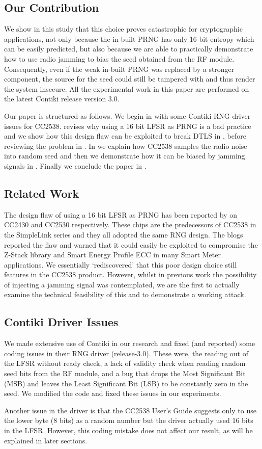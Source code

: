 \subsection{Our Contribution}
We show in this study that this choice proves catastrophic for cryptographic applications, not only because the in-built PRNG has only 16 bit entropy which can be easily predicted, but also because we are able to practically demonstrate how to use radio jamming to bias the seed obtained from the RF module. Consequently, even if the weak in-built PRNG was replaced by a stronger component, the source for the seed could still be tampered with and thus render the system insecure. All the experimental work in this paper are performed on the latest Contiki release version 3.0\cite{ContikiRelease3.0}.

Our paper is structured as follows. We begin in  with some Contiki RNG driver issues for CC2538.  revises why using a 16 bit LFSR as PRNG is a bad practice and we show how this design flaw can be exploited to break DTLS in , before reviewing the problem in . In  we explain how CC2538 samples the radio noise into random seed and then we demonstrate how it can be biased by jamming signals in . Finally we conclude the paper in .

\subsection{Related Work}
The design flaw of using a 16 bit LFSR as PRNG has been reported by \cite{SmartMeterBlog}\cite{CC2530PRNG} on CC2430\cite{CC2430Manual} and CC2530\cite{CC2530Manual} respectively. These chips are the predecessors of CC2538 in the SimpleLink\cite{SimpleLink} series and they all adopted the same RNG design. The blogs reported the flaw and warned that it could easily be exploited to compromise the Z-Stack library\cite{ZStack} and Smart Energy Profile ECC in many Smart Meter applications. We essentially `rediscovered' that this poor design choice still features in the CC2538 product. However, whilst in previous work the possibility of injecting a jamming signal was contemplated, we are the first to actually examine the technical feasibility of this and to demonstrate a working attack.


\subsection{Contiki Driver Issues}\label{ContikiDriverIssue}
We made extensive use of Contiki in our research and fixed (and reported) some coding issues in their RNG driver (release-3.0). These were, the reading out of the LFSR without ready check, a lack of validity check when reading random seed bits from the RF module, and a bug that drops the Most Significant Bit (MSB) and leaves the Least Significant Bit (LSB) to be constantly zero in the seed.  We modified the code and fixed these issues in our experiments. 

Another issue in the driver is that the CC2538 User's Guide\cite{CC2538Manual} suggests only to use the lower byte (8 bits) as a random number but the driver actually used 16 bits in the LFSR. However, this coding mistake does not affect our result, as will be explained in  later sections.